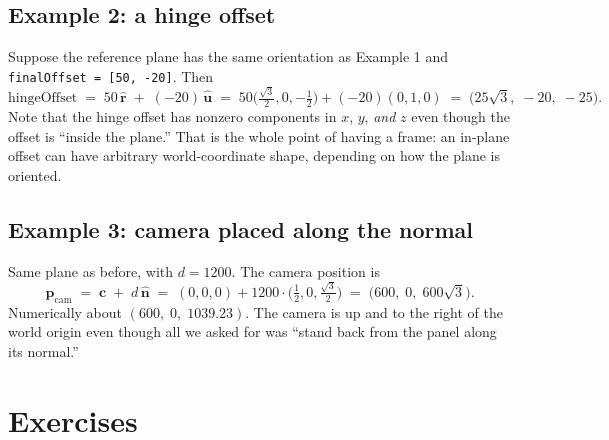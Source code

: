 \documentclass{article}
\begin{document}
\subsection*{Example 2: a hinge offset}

Suppose the reference plane has the same orientation as Example 1 and
\verb|finalOffset = [50, -20]|. Then
\[
    \text{hingeOffset}
    \;=\; 50\,\hat{\mathbf{r}} \;+\; (-20)\,\hat{\mathbf{u}}
    \;=\; 50\bigl(\tfrac{\sqrt{3}}{2}, 0, -\tfrac{1}{2}\bigr) + (-20)(0,1,0)
    \;=\; \bigl(25\sqrt{3},\; -20,\; -25\bigr).
\]
Note that the hinge offset has nonzero components in $x$, $y$, \emph{and} $z$
even though the offset is ``inside the plane.'' That is the whole point of
having a frame: an in-plane offset can have arbitrary world-coordinate
shape, depending on how the plane is oriented.

\subsection*{Example 3: camera placed along the normal}

Same plane as before, with $d = 1200$. The camera position is
\[
    \mathbf{p}_{\text{cam}}
    \;=\; \mathbf{c} \;+\; d\,\hat{\mathbf{n}}
    \;=\; (0,0,0) + 1200\cdot\bigl(\tfrac{1}{2}, 0, \tfrac{\sqrt{3}}{2}\bigr)
    \;=\; \bigl(600,\; 0,\; 600\sqrt{3}\bigr).
\]
Numerically about $(600,\; 0,\; 1039.23)$. The camera is up and to the
right of the world origin even though all we asked for was ``stand back from
the panel along its normal.''

\section{Exercises}
\end{document}
